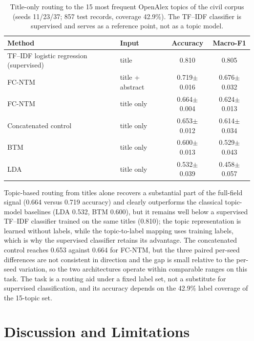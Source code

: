 \documentclass[Journal,letterpaper]{ascelike-new}
\newcommand{\fcntm}{FC-NTM}
\begin{document}
\begin{table}[t]
\centering
\caption{Title-only routing to the 15 most frequent OpenAlex topics of the civil corpus (seeds 11/23/37; 857 test records, coverage 42.9\%). The TF--IDF classifier is supervised and serves as a reference point, not as a topic model.}
\label{tab:archival}
\small
\begin{tabular}{llcc}
\toprule
Method & Input & Accuracy & Macro-F1 \\
\midrule
TF--IDF logistic regression (supervised) & title & 0.810 & 0.805 \\
\fcntm{} & title + abstract & 0.719$\pm$0.016 & 0.676$\pm$0.032 \\
\fcntm{} & title only & 0.664$\pm$0.004 & 0.624$\pm$0.013 \\
Concatenated control & title only & 0.653$\pm$0.012 & 0.614$\pm$0.034 \\
BTM & title only & 0.600$\pm$0.013 & 0.529$\pm$0.043 \\
LDA & title only & 0.532$\pm$0.039 & 0.458$\pm$0.057 \\
\bottomrule
\end{tabular}
\end{table}

Topic-based routing from titles alone recovers a substantial part of the full-field signal
(0.664 versus 0.719 accuracy) and clearly outperforms the classical topic-model baselines
(LDA 0.532, BTM 0.600), but it remains well below a supervised TF--IDF classifier trained on the
same titles (0.810); the topic representation is learned without labels, while the topic-to-label
mapping uses training labels, which is why the supervised classifier retains its advantage. The
concatenated control reaches 0.653 against 0.664 for \fcntm{}, but the three paired per-seed
differences are not consistent in direction and the gap is small relative to the per-seed
variation, so the two architectures operate within comparable ranges on this task. The task
is a routing aid under a fixed label set, not a substitute for supervised classification, and
its accuracy depends on the 42.9\% label coverage of the 15-topic set.

\section{Discussion and Limitations}
\end{document}
